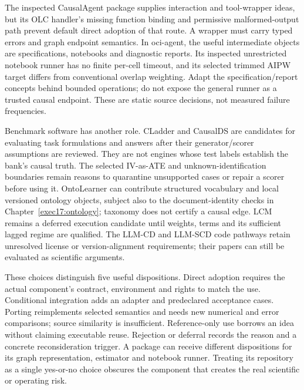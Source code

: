 The inspected CausalAgent package supplies interaction and tool-wrapper
ideas, but its OLC handler's missing function binding and permissive
malformed-output path prevent default direct adoption of that route. A
wrapper must carry typed errors and graph endpoint semantics. In oci-agent,
the useful intermediate objects are specifications, notebooks and diagnostic
reports. Its inspected unrestricted notebook runner has no finite per-cell
timeout, and its selected trimmed AIPW target differs from conventional
overlap weighting. Adapt the specification/report concepts behind bounded
operations; do not expose the general runner as a trusted causal endpoint.
These are static source decisions, not measured failure frequencies.
\citep{v12_la_package_causalagent,v12_la_package_oci_agent}

Benchmark software has another role. CLadder and CausalDS are candidates
for evaluating task formulations and answers after their generator/scorer
assumptions are reviewed. They are not engines whose test labels establish
the bank's causal truth. The selected IV-as-ATE and unknown-identification
boundaries remain reasons to quarantine unsupported cases or repair a
scorer before using it. OntoLearner can contribute structured vocabulary
and local versioned ontology objects, subject also to the document-identity
checks in Chapter~\ref{exec17:ontology}; taxonomy does not certify a causal
edge. LCM remains a deferred execution candidate until weights,
terms and its sufficient lagged regime are qualified. The LLM-CD and
LLM-SCD code pathways retain unresolved license or version-alignment
requirements; their papers can still be evaluated as scientific arguments.
\citep{v12_la_package_cladder,v12_la_package_causalds,v12_la_package_ontolearner,
v12_la_package_lcm,v12_la_package_llm_cd,v12_la_package_llm_scd}

These choices distinguish five useful dispositions. Direct adoption requires
the actual component's contract, environment and rights to match the use.
Conditional integration adds an adapter and predeclared acceptance cases.
Porting reimplements selected semantics and needs new numerical and error
comparisons; source similarity is insufficient. Reference-only use borrows
an idea without claiming executable reuse. Rejection or deferral records
the reason and a concrete reconsideration trigger. A package can receive
different dispositions for its graph representation, estimator and notebook
runner. Treating its repository as a single yes-or-no choice obscures the
component that creates the real scientific or operating risk.

